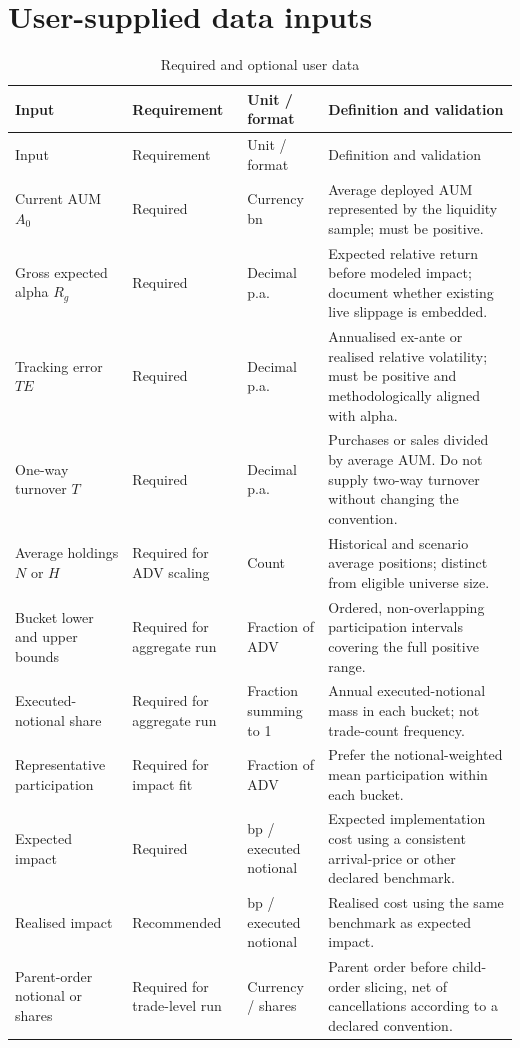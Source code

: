 \documentclass[11pt,a4paper]{article}
\numberwithin{equation}{section}
\begin{document}
\appendix
\section{User-supplied data inputs}
\small
\begin{longtable}{@{}p{}p{}p{}p{}@{}}
\caption{Required and optional user data}\label{tab:userinputs}\\
\toprule
Input & Requirement & Unit / format & Definition and validation\\
\midrule
\endfirsthead
\toprule
Input & Requirement & Unit / format & Definition and validation\\
\midrule
\endhead
Current AUM $A_0$ & Required & Currency bn & Average deployed AUM represented by the liquidity sample; must be positive.\\
Gross expected alpha $R_g$ & Required & Decimal p.a. & Expected relative return before modeled impact; document whether existing live slippage is embedded.\\
Tracking error $TE$ & Required & Decimal p.a. & Annualised ex-ante or realised relative volatility; must be positive and methodologically aligned with alpha.\\
One-way turnover $T$ & Required & Decimal p.a. & Purchases or sales divided by average AUM. Do not supply two-way turnover without changing the convention.\\
Average holdings $N$ or $H$ & Required for ADV scaling & Count & Historical and scenario average positions; distinct from eligible universe size.\\
Bucket lower and upper bounds & Required for aggregate run & Fraction of ADV & Ordered, non-overlapping participation intervals covering the full positive range.\\
Executed-notional share & Required for aggregate run & Fraction summing to 1 & Annual executed-notional mass in each bucket; not trade-count frequency.\\
Representative participation & Required for impact fit & Fraction of ADV & Prefer the notional-weighted mean participation within each bucket.\\
Expected impact & Required & bp / executed notional & Expected implementation cost using a consistent arrival-price or other declared benchmark.\\
Realised impact & Recommended & bp / executed notional & Realised cost using the same benchmark as expected impact.\\
Parent-order notional or shares & Required for trade-level run & Currency / shares & Parent order before child-order slicing, net of cancellations according to a declared convention.\\

\end{longtable}
\end{document}
